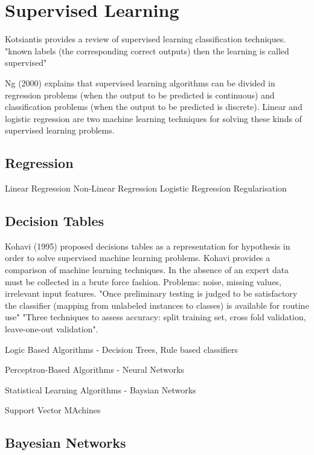 \section{Supervised Learning}

Kotsiantis\cite{kotsiantis2007supervised} provides a review of supervised learning classification techniques. "known labels (the corresponding correct outputs) then the learning is called supervised"


Ng (2000) explains that supervised learning algorithms can be divided in regression problems (when the output to be predicted is continuous) and classification problems (when the output to be predicted is discrete). Linear and logistic regression are two machine learning techniques for solving these kinds of supervised learning problems.

\subsection{Regression}

Linear Regression
Non-Linear Regression
Logistic Regression
Regularisation

\subsection{Decision Tables}

Kohavi (1995) proposed decisions tables as a representation for hypothesis in order to solve supervised machine learning problems.
Kohavi provides a comparison of machine learning techniques.
In the absence of an expert data must be collected in a brute force fashion. Problems: noise, missing values, irrelevant input features.
"Once preliminary testing is judged to be satisfactory the classifier (mapping from unlabeled instances to classes) is available for routine use"
"Three techniques to assess accuracy: split training set, cross fold validation, leave-one-out validation".

Logic Based Algorithms  - Decision Trees, Rule based classifiers

Perceptron-Based Algorithms - Neural Networks

Statistical Learning Algorithms - Baysian Networks

Support Vector MAchines

\subsection{Bayesian Networks}

